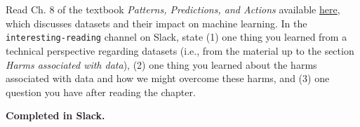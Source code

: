 \documentclass{article}[12pt]
\begin{document}
\section{}

Read Ch. 8 of the textbook \textit{Patterns, Predictions, and Actions} available \href{https://arxiv.org/pdf/2102.05242.pdf}{here}, which discusses datasets and their impact on machine learning. In the \texttt{interesting-reading} channel on Slack, state (1) one thing you learned from a technical perspective regarding datasets (i.e., from the material up to the section \textit{Harms associated with data}), (2) one thing you learned about the harms associated with data and how we
might overcome these harms, and (3) one question you have after reading the chapter.

\textbf{Completed in Slack.}
\end{document}
